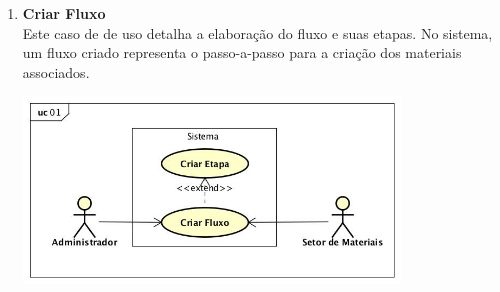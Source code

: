 \begin{enumerate}[label=\textbf{UC\protect\twodigits{\theenumi}}, leftmargin=2cm]
	\item \textbf{Criar Fluxo} \\
	Este caso de de uso detalha a elaboração do fluxo e suas etapas. No sistema, um fluxo criado representa o passo-a-passo para a criação dos materiais associados. \\
	\begin{minipage}[c]{10cm}
	    \includegraphics[width=10cm]{Imagens/UC_CriarFluxo.jpg}
		\label{fig:uc_criar_fluxo}
	\end{minipage} \\


\end{enumerate}
